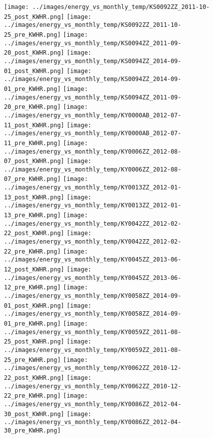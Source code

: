 \clearpage
\begin{figure}
\centering
\texttt{[image: ../images/energy\_vs\_monthly\_temp/KS0092ZZ\_2011-10-25\_post\_KWHR.png]}
\texttt{[image: ../images/energy\_vs\_monthly\_temp/KS0092ZZ\_2011-10-25\_pre\_KWHR.png]}
\texttt{[image: ../images/energy\_vs\_monthly\_temp/KS0094ZZ\_2011-09-20\_post\_KWHR.png]}
\texttt{[image: ../images/energy\_vs\_monthly\_temp/KS0094ZZ\_2014-09-01\_post\_KWHR.png]}
\texttt{[image: ../images/energy\_vs\_monthly\_temp/KS0094ZZ\_2014-09-01\_pre\_KWHR.png]}
\texttt{[image: ../images/energy\_vs\_monthly\_temp/KS0094ZZ\_2011-09-20\_pre\_KWHR.png]}
\texttt{[image: ../images/energy\_vs\_monthly\_temp/KY0000AB\_2012-07-11\_post\_KWHR.png]}
\texttt{[image: ../images/energy\_vs\_monthly\_temp/KY0000AB\_2012-07-11\_pre\_KWHR.png]}
\texttt{[image: ../images/energy\_vs\_monthly\_temp/KY0006ZZ\_2012-08-07\_post\_KWHR.png]}
\texttt{[image: ../images/energy\_vs\_monthly\_temp/KY0006ZZ\_2012-08-07\_pre\_KWHR.png]}
\texttt{[image: ../images/energy\_vs\_monthly\_temp/KY0013ZZ\_2012-01-13\_post\_KWHR.png]}
\texttt{[image: ../images/energy\_vs\_monthly\_temp/KY0013ZZ\_2012-01-13\_pre\_KWHR.png]}
\texttt{[image: ../images/energy\_vs\_monthly\_temp/KY0042ZZ\_2012-02-22\_post\_KWHR.png]}
\texttt{[image: ../images/energy\_vs\_monthly\_temp/KY0042ZZ\_2012-02-22\_pre\_KWHR.png]}
\texttt{[image: ../images/energy\_vs\_monthly\_temp/KY0045ZZ\_2013-06-12\_post\_KWHR.png]}
\texttt{[image: ../images/energy\_vs\_monthly\_temp/KY0045ZZ\_2013-06-12\_pre\_KWHR.png]}
\texttt{[image: ../images/energy\_vs\_monthly\_temp/KY0058ZZ\_2014-09-01\_post\_KWHR.png]}
\texttt{[image: ../images/energy\_vs\_monthly\_temp/KY0058ZZ\_2014-09-01\_pre\_KWHR.png]}
\texttt{[image: ../images/energy\_vs\_monthly\_temp/KY0059ZZ\_2011-08-25\_post\_KWHR.png]}
\texttt{[image: ../images/energy\_vs\_monthly\_temp/KY0059ZZ\_2011-08-25\_pre\_KWHR.png]}
\texttt{[image: ../images/energy\_vs\_monthly\_temp/KY0062ZZ\_2010-12-22\_post\_KWHR.png]}
\texttt{[image: ../images/energy\_vs\_monthly\_temp/KY0062ZZ\_2010-12-22\_pre\_KWHR.png]}
\texttt{[image: ../images/energy\_vs\_monthly\_temp/KY0086ZZ\_2012-04-30\_post\_KWHR.png]}
\texttt{[image: ../images/energy\_vs\_monthly\_temp/KY0086ZZ\_2012-04-30\_pre\_KWHR.png]}
\end{figure}
